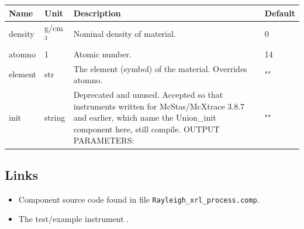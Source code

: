 \begin{longtable}{p{}p{}p{}p{}}
\toprule
\textbf{Name} & \textbf{Unit} & \textbf{Description} & \textbf{Default} \\
\midrule
\endhead
density & g/cm$^{3}$ & Nominal density of material. & 0 \\
atomno & 1 & Atomic number. & 14 \\
element & str & The element (symbol) of the material. Overrides atomno. & "" \\
init & string & Deprecated and unused. Accepted so that instruments written for McStas/McXtrace 3.8.7 and earlier, which name the Union\_init component here, still compile. OUTPUT PARAMETERS: & "" \\
\bottomrule
\end{longtable}

\subsection*{Links}
\begin{itemize}
  \item Component source code found in file \texttt{Rayleigh\_xrl\_process.comp}.
  \item The test/example instrument .
\end{itemize}
